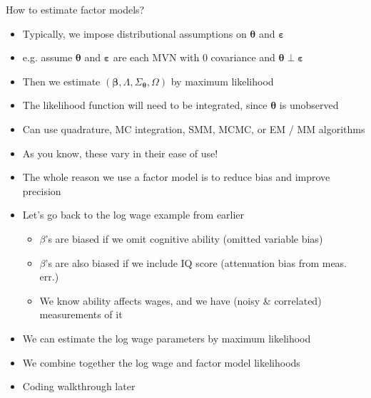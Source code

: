\documentclass[aspectratio=169]{beamer}
\begin{document}
\begin{frame}

How to estimate factor models?

\bigskip{}

\begin{itemize}
\itemsep1.5em
\item<2-> Typically, we impose distributional assumptions on $\boldsymbol{\theta}$ and $\boldsymbol{\varepsilon}$
\item<3-> e.g. assume $\boldsymbol{\theta}$ and $\boldsymbol{\varepsilon}$ are each MVN with 0 covariance and $\boldsymbol{\theta} \perp \boldsymbol{\varepsilon}$
\item<4-> Then we estimate $(\boldsymbol{\beta}, \Lambda, \Sigma_{\boldsymbol{\theta}}, \Omega)$ by maximum likelihood
\item<5-> The likelihood function will need to be integrated, since $\boldsymbol{\theta}$ is unobserved
\item<6-> Can use quadrature, MC integration, SMM, MCMC, or EM / MM algorithms
\item<7-> As you know, these vary in their ease of use!
\end{itemize}
\end{frame}



\begin{frame}

\begin{itemize}
\itemsep1.5em
\item<1-> The whole reason we use a factor model is to reduce bias and improve precision
\item<2-> Let's go back to the log wage example from earlier
\bigskip\par
\begin{itemize}
    \itemsep1.5em
    \item<3-> $\beta$'s are biased if we omit cognitive ability (omitted variable bias)
    \item<4-> $\beta$'s are also biased if we include IQ score (attenuation bias from meas. err.)
    \item<5-> We know ability affects wages, and we have (noisy \& correlated) measurements of it
\end{itemize}
\item<6-> We can estimate the log wage parameters by maximum likelihood
\item<7-> We combine together the log wage and factor model likelihoods
\item<8-> Coding walkthrough later
\end{itemize}

\end{frame}
\end{document}

